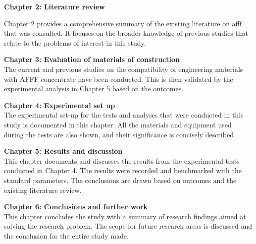 \textbf{Chapter 2: Literature review}

Chapter 2 provides a comprehensive summary of the existing literature on \acrshort{afff} that was consulted. It focuses on the broader knowledge of previous studies that relate to the problems of interest in this study.

\textbf{Chapter 3: Evaluation of materials of construction} \\
The current and previous studies on the compatibility of engineering materials with AFFF concentrate have been conducted. This is then validated by the experimental analysis in Chapter 5 based on the outcomes.

\textbf{Chapter 4: Experimental set up} \\
The experimental set-up for the tests and analyses that were conducted in this study is documented in this chapter. All the materials and equipment used during the tests are also shown, and their significance is concisely described.

\textbf{Chapter 5: Results and discussion} \\
This chapter documents and discusses the results from the experimental tests conducted in Chapter 4. The results were recorded and benchmarked with the standard parameters. The conclusions are drawn based on outcomes and the existing literature review. 

\textbf{Chapter 6: Conclusions and further work} \\
This chapter concludes the study with a summary of research findings aimed at solving the
research problem. The scope for future research areas is discussed and the conclusion for the entire study made.
